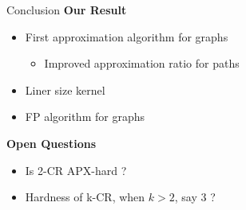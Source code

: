 \begin{frame}{Conclusion}
\textbf{Our Result}
	\pause
	\begin{itemize}
	\item First approximation algorithm for graphs
		\begin{itemize}
		\pause\item
		Improved approximation ratio for paths 
		\end{itemize}
	
	\pause\item
	Liner size kernel
	
	\pause\item
	FP algorithm for graphs
	
	\end{itemize}

\pause
\textbf{Open Questions}
	\begin{itemize}
	
	\pause\item
	Is 2-CR APX-hard ?
	
	\pause\item
	Hardness of k-CR, when $k > 2$, say 3 ?
	
	\end{itemize}

\end{frame}